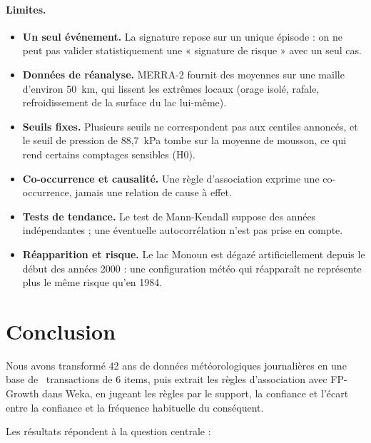 \documentclass[12pt, a4paper]{article}
\begin{document}
\paragraph{Limites.}
\begin{itemize}
  \item \textbf{Un seul événement.} La signature repose sur un unique épisode : on ne peut pas
        valider statistiquement une « signature de risque » avec un seul cas.
  \item \textbf{Données de réanalyse.} MERRA-2 fournit des moyennes sur une maille d'environ
        50~km, qui lissent les extrêmes locaux (orage isolé, rafale, refroidissement de la
        surface du lac lui-même).
  \item \textbf{Seuils fixes.} Plusieurs seuils ne correspondent pas aux centiles annoncés, et le
        seuil de pression de 88,7~kPa tombe sur la moyenne de mousson, ce qui rend certains
        comptages sensibles (H0).
  \item \textbf{Co-occurrence et causalité.} Une règle d'association exprime une co-occurrence,
        jamais une relation de cause à effet.
  \item \textbf{Tests de tendance.} Le test de Mann-Kendall suppose des années indépendantes ; une
        éventuelle autocorrélation n'est pas prise en compte.
  \item \textbf{Réapparition et risque.} Le lac Monoun est dégazé artificiellement depuis le
        début des années 2000 : une configuration météo qui réapparaît ne représente plus le
        même risque qu'en 1984.
\end{itemize}

\section{Conclusion}

Nous avons transformé 42 ans de données météorologiques journalières en une base de
\Njours~transactions de 6 items, puis extrait les règles d'association avec FP-Growth dans
Weka, en jugeant les règles par le support, la confiance et l'écart entre la confiance et la
fréquence habituelle du conséquent.

Les résultats répondent à la question centrale :
\end{document}
